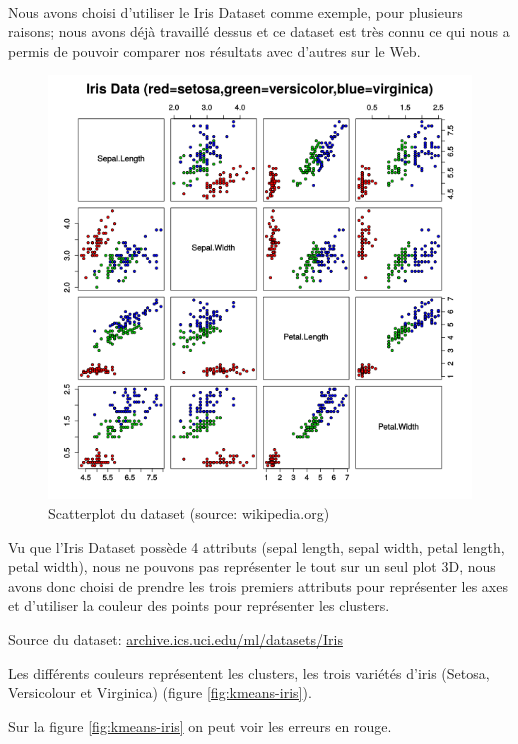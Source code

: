 \documentclass{article}
\begin{document}
  \

  Nous avons choisi d'utiliser le Iris Dataset comme exemple, pour plusieurs raisons;
  nous avons déjà travaillé dessus et ce dataset est très connu ce qui nous a permis de
  pouvoir comparer nos résultats avec d'autres sur le Web.

  \begin{figure}[h]
    \centering
    \includegraphics[scale=0.5]{images/Iris_dataset_scatterplot.png}
    \caption{Scatterplot du dataset (source: wikipedia.org)}
    \label{fig:scatterplot-wiki}
  \end{figure}



  Vu que l'Iris Dataset possède 4 attributs (sepal length, sepal width, petal length, petal width),
  nous ne pouvons pas représenter le tout sur un seul plot 3D, nous avons donc choisi de prendre les trois premiers attributs
  pour représenter les axes
  et d'utiliser la couleur des points pour représenter les clusters.

  Source du dataset: \url{archive.ics.uci.edu/ml/datasets/Iris}

  \newpage
  Les différents couleurs représentent les clusters, les trois variétés d'iris (Setosa, Versicolour et Virginica) (figure \ref{fig:kmeans-iris}).

  Sur la figure \ref{fig:kmeans-iris} on peut voir les erreurs en rouge.
\end{document}
